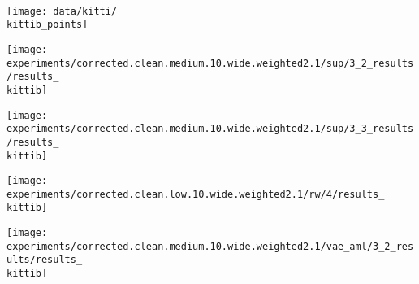 \\
\begin{minipage}[t]{0.02\textwidth}
    \vspace{0px}\centering
\end{minipage}
\begin{minipage}[t]{0.1\textwidth}
    \vspace{0px}\centering
    \texttt{[image: data/kitti/\\kittib\_points]}
\end{minipage}
\begin{minipage}[t]{0.1\textwidth}
    \vspace{0px}\centering
    \texttt{[image: experiments/corrected.clean.medium.10.wide.weighted2.1/sup/3\_2\_results/results\_\\kittib]}
\end{minipage}
\begin{minipage}[t]{0.1\textwidth}
    \vspace{0px}\centering
    \texttt{[image: experiments/corrected.clean.medium.10.wide.weighted2.1/sup/3\_3\_results/results\_\\kittib]}
\end{minipage}
\begin{minipage}[t]{0.1\textwidth}
    \vspace{0px}\centering
    \texttt{[image: experiments/corrected.clean.low.10.wide.weighted2.1/rw/4/results\_\\kittib]}
\end{minipage}
\begin{minipage}[t]{0.1\textwidth}
    \vspace{0px}\centering
\end{minipage}
\begin{minipage}[t]{0.1\textwidth}
    \vspace{0px}\centering
    \texttt{[image: experiments/corrected.clean.medium.10.wide.weighted2.1/vae\_aml/3\_2\_results/results\_\\kittib]}
\end{minipage}
